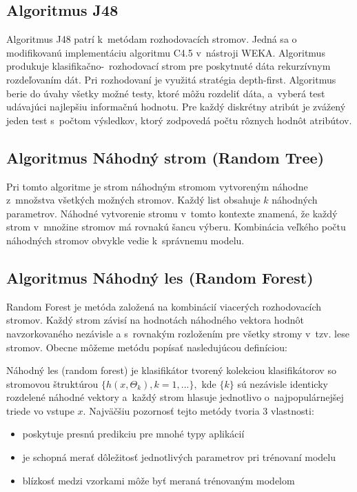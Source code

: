 \subsection{Algoritmus J48}

Algoritmus J48 patrí k~metódam rozhodovacích stromov. Jedná sa o modifikovanú implementáciu algoritmu C4.5 v~nástroji WEKA. Algoritmus produkuje klasifikačno-~rozhodovací strom pre poskytnuté dáta rekurzívnym rozdeľovaním dát. Pri rozhodovaní je využitá stratégia depth-first. Algoritmus berie do úvahy všetky možné testy, ktoré môžu rozdeliť dáta, a~vyberá test udávajúci najlepšiu informačnú hodnotu. Pre každý diskrétny atribút je zvážený jeden test s~počtom výsledkov, ktorý zodpovedá počtu rôznych hodnôt atribútov.  

\subsection{Algoritmus Náhodný strom (Random Tree)}

Pri tomto algoritme je strom náhodným stromom vytvoreným náhodne z~množstva všetkých možných stromov. Každý list obsahuje $k$ náhodných parametrov. Náhodné vytvorenie stromu v~tomto kontexte znamená, že každý strom v~množine stromov má rovnakú šancu výberu. Kombinácia veľkého počtu náhodných stromov obvykle vedie k~správnemu modelu. 

\subsection{Algoritmus Náhodný les (Random Forest)}

Random Forest \cite{breiman} je metóda založená na kombinácií viacerých rozhodovacích stromov. Každý strom závisí na hodnotách náhodného vektora hodnôt navzorkovaného nezávisle a s~rovnakým rozložením pre všetky stromy v~tzv. lese stromov. Obecne môžeme metódu popísať nasledujúcou definíciou:

Náhodný les (random forest) je klasifikátor tvorený kolekciou klasifikátorov so stromovou štruktúrou $\{h(x,\Theta_{k}), k=1, ...\}, $ kde $\{k\}$ sú nezávisle identicky rozdelené náhodné vektory a~každý strom hlasuje jednotlivo o~najpopulárnejšej triede vo vstupe $x$.
\newpage
Najväčšiu pozornosť tejto metódy tvoria 3 vlastnosti:
\begin{itemize}
	\item poskytuje presnú predikciu pre mnohé typy aplikácií
	\item je schopná merať dôležitosť jednotlivých parametrov pri trénovaní modelu
	\item blízkosť medzi vzorkami môže byť meraná trénovaným modelom
\end{itemize} 


